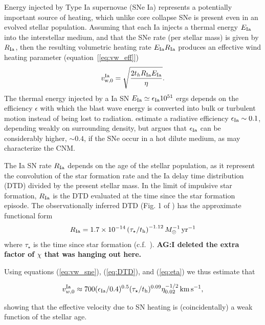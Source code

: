 \documentclass[usenatbib,fleqn]{mn2e}
\newcommand{\RateIa}{R_{\rm Ia}}
\begin{document}
Energy injected by Type Ia supernovae (SNe Ia) represents a
potentially important source of heating, which unlike core collapse
SNe is present even in an evolved stellar population.  Assuming that
each Ia injects a thermal energy $E_{\rm Ia}$ into the interstellar
medium, and that the SNe rate (per stellar mass) is given by $R_{\rm
  Ia}$, then the resulting volumetric heating rate $E_{\rm Ia}R_{\rm
  Ia}$ produces an effective wind heating parameter
(equation~[\ref{eq:vw_eff}])
\begin{align} v_{\rm w,0}^{\rm Ia} =\sqrt{\frac{2 t_h R_{\rm Ia}
E_{\rm Ia}}{\eta}} \label{eq:vw_sne}.
\end{align} The thermal energy injected by a Ia SN $E_{\rm Ia} \simeq
\epsilon_{\rm Ia} 10^{51}$ ergs depends on the efficiency $\epsilon$
with which the blast wave energy is converted into bulk or turbulent
motion instead of being lost to radiation.  \cite{Thornton+98}
estimate a radiative efficiency $\epsilon_{\rm Ia} \sim 0.1$,
depending weakly on surrounding density, but \citet{Sharma+14} argues
that $\epsilon_{\rm Ia}$ can be considerably higher, $\sim 0.4$, if
the SNe occur in a hot dilute medium, as may characterize the CNM.

The Ia SN rate $\RateIa$ depends on the age of the stellar population,
as it represent the convolution of the star formation rate and the Ia
delay time distribution (DTD) divided by the present stellar mass.  In
the limit of impulsive star formation, $\RateIa$ is the DTD evaluated
at the time since the star formation episode.  The observationally
inferred DTD (Fig. 1 of \citealt{MaozMannucci+:2012a}) has the
approximate functional form
\begin{align}
  R_{\rm Ia} =1.7\times 10^{-14}\left(\tau_{\star}/t_{\rm
      h}\right)^{-1.12} M_{\odot}^{-1}\,{\rm yr^{-1}}
\label{eq:DTD}
  \end{align}
  where $\tau_{\star}$ is the time since star formation
  (c.f.~\citealt{Scannapieco&Bildsten05}). {\bf AG:I deleted the extra
    factor of $\chi$ that was hanging out here.}

  Using equations (\ref{eq:vw_sne}), (\ref{eq:DTD}), and
  (\ref{eq:eta}) we thus estimate that 

  \begin{align} 
    v_{w,0}^{\rm Ia} \approx 700(\epsilon_{\rm
      Ia}/0.4)^{0.5}(\tau_{\star}/t_{\rm h})^{0.09} \eta_{0.02}^{-1/2}\,{\rm km
      \,s^{-1}},
  \end{align}

 showing that the effective
  velocity due to SN heating is (coincidentally) a weak function of
  the stellar age.
\end{document}

